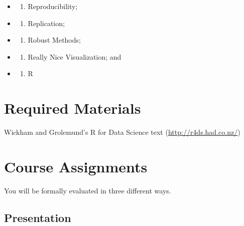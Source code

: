 \begin{itemize}
\item
  \begin{enumerate}
  \def\labelenumi{\arabic{enumi}.}
  \tightlist
  \item
    Reproducibility;
  \end{enumerate}
\item
  \begin{enumerate}
  \def\labelenumi{\arabic{enumi}.}
  \setcounter{enumi}{1}
  \tightlist
  \item
    Replication;
  \end{enumerate}
\item
  \begin{enumerate}
  \def\labelenumi{\arabic{enumi}.}
  \setcounter{enumi}{2}
  \tightlist
  \item
    Robust Methods;
  \end{enumerate}
\item
  \begin{enumerate}
  \def\labelenumi{\arabic{enumi}.}
  \setcounter{enumi}{3}
  \tightlist
  \item
    Really Nice Visualization; and
  \end{enumerate}
\item
  \begin{enumerate}
  \def\labelenumi{\arabic{enumi}.}
  \setcounter{enumi}{4}
  \tightlist
  \item
    R
  \end{enumerate}
\end{itemize}

\hypertarget{required-materials-2}{%
\section*{Required Materials}\label{required-materials-2}}


Wickham and Grolemund's R for Data Science text (\url{http://r4ds.had.co.nz/})

\hypertarget{course-assignments-3}{%
\section*{Course Assignments}\label{course-assignments-3}}


You will be formally evaluated in three different ways.

\hypertarget{presentation}{%
\subsection*{Presentation}\label{presentation}}


